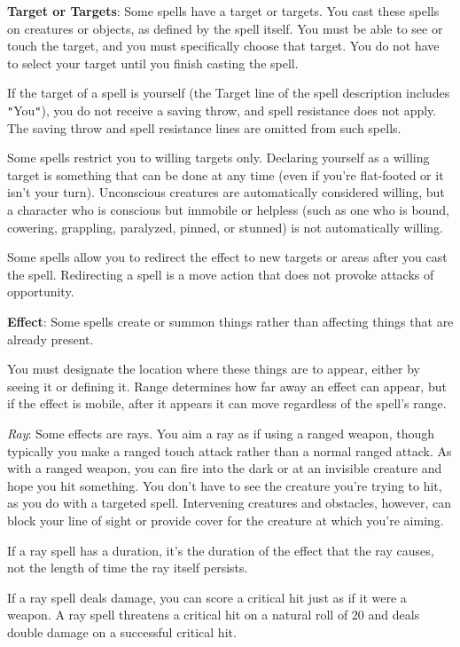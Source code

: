 \textbf{Target or Targets}: Some spells have a target or targets. You cast these spells on creatures or objects, as defined by the spell itself. You must be able to see or touch the target, and you must specifically choose that target. You do not have to select your target until you finish casting the spell.
				
If the target of a spell is yourself (the Target line of the spell description includes \texttt{{}"{}}You\texttt{{}"{}}), you do not receive a saving throw, and spell resistance does not apply. The saving throw and spell resistance lines are omitted from such spells.
				
Some spells restrict you to willing targets only. Declaring yourself as a willing target is something that can be done at any time (even if you're flat-footed or it isn't your turn). Unconscious creatures are automatically considered willing, but a character who is conscious but immobile or helpless (such as one who is bound, cowering, grappling, paralyzed, pinned, or stunned) is not automatically willing.
				
Some spells allow you to redirect the effect to new targets or areas after you cast the spell. Redirecting a spell is a move action that does not provoke attacks of opportunity.
				
\textbf{Effect}: Some spells create or summon things rather than affecting things that are already present.
				
You must designate the location where these things are to appear, either by seeing it or defining it. Range determines how far away an effect can appear, but if the effect is mobile, after it appears it can move regardless of the spell's range.
				
\textit{Ray}: Some effects are rays. You aim a ray as if using a ranged weapon, though typically you make a ranged touch attack rather than a normal ranged attack. As with a ranged weapon, you can fire into the dark or at an invisible creature and hope you hit something. You don't have to see the creature you're trying to hit, as you do with a targeted spell. Intervening creatures and obstacles, however, can block your line of sight or provide cover for the creature at which you're aiming.
				
If a ray spell has a duration, it's the duration of the effect that the ray causes, not the length of time the ray itself persists.
				
If a ray spell deals damage, you can score a critical hit just as if it were a weapon. A ray spell threatens a critical hit on a natural roll of 20 and deals double damage on a successful critical hit.
				
